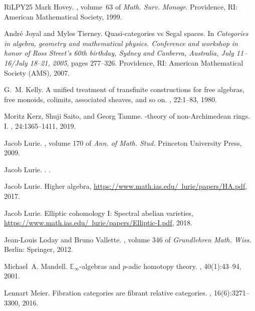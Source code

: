\documentclass{proc-l}
\theoremstyle{plain}
\theoremstyle{definition}
\theoremstyle{remark}
\begin{document}
\begin{thebibliography}{RiLPY25}
Mark Hovey.
, volume~63 of {\em Math. Surv. Monogr.}
\newblock Providence, RI: American Mathematical Society, 1999.

Andr{\'e} Joyal and Myles Tierney.
\newblock Quasi-categories vs {Segal} spaces.
\newblock In {\em Categories in algebra, geometry and mathematical physics.
  Conference and workshop in honor of Ross Street's 60th birthday, Sydney and
  Canberra, Australia, July 11--16/July 18--21, 2005}, pages 277--326.
  Providence, RI: American Mathematical Society (AMS), 2007.

G.~M. Kelly.
\newblock A unified treatment of transfinite constructions for free algebras,
  free monoids, colimits, associated sheaves, and so on.
, 22:1--83, 1980.

Moritz Kerz, Shuji Saito, and Georg Tamme.
-theory of non-{Archimedean} rings. {I}.
, 24:1365--1411, 2019.

Jacob Lurie.
, volume 170 of {\em Ann. of Math. Stud.}
\newblock Princeton University Press, 2009.

Jacob Lurie.
.
.

Jacob Lurie.
\newblock Higher algebra,
  \href{https://www.math.ias.edu/~lurie/papers/HA.pdf}{https://www.math.ias.edu/~lurie/papers/HA.pdf},
  2017.

Jacob Lurie.
\newblock Elliptic cohomology {I}: Spectral abelian varieties,
  \href{https://www.math.ias.edu/~lurie/papers/Elliptic-I.pdf}{https://www.math.ias.edu/~lurie/papers/Elliptic-I.pdf},
  2018.

Jean-Louis Loday and Bruno Vallette.
, volume 346 of {\em Grundlehren Math. Wiss.}
\newblock Berlin: Springer, 2012.

Michael~A. Mandell.
\newblock $\mathbb{E}_\infty$-algebras and $p$-adic homotopy theory.
, 40(1):43--94, 2001.

Lennart Meier.
\newblock Fibration categories are fibrant relative categories.
, 16(6):3271--3300, 2016.


\end{thebibliography}
\end{document}
